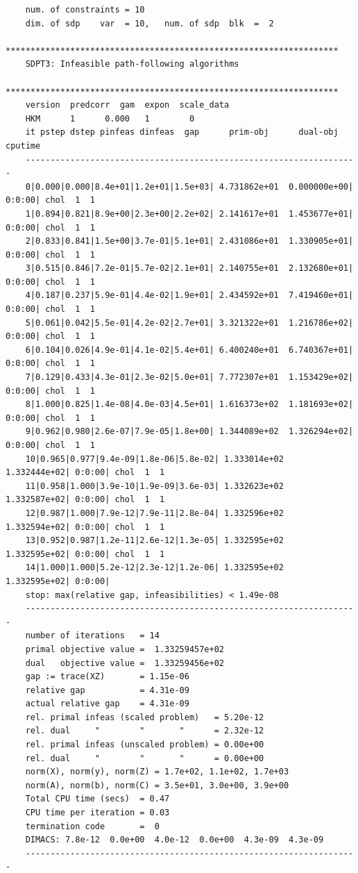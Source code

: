\documentclass[letter]{article}
\begin{document}
\begin{Verbatim}
	num. of constraints = 10
	dim. of sdp    var  = 10,   num. of sdp  blk  =  2
	*******************************************************************
	SDPT3: Infeasible path-following algorithms
	*******************************************************************
	version  predcorr  gam  expon  scale_data
	HKM      1      0.000   1        0    
	it pstep dstep pinfeas dinfeas  gap      prim-obj      dual-obj    cputime
	-------------------------------------------------------------------
	0|0.000|0.000|8.4e+01|1.2e+01|1.5e+03| 4.731862e+01  0.000000e+00| 0:0:00| chol  1  1 
	1|0.894|0.821|8.9e+00|2.3e+00|2.2e+02| 2.141617e+01  1.453677e+01| 0:0:00| chol  1  1 
	2|0.833|0.841|1.5e+00|3.7e-01|5.1e+01| 2.431086e+01  1.330905e+01| 0:0:00| chol  1  1 
	3|0.515|0.846|7.2e-01|5.7e-02|2.1e+01| 2.140755e+01  2.132680e+01| 0:0:00| chol  1  1 
	4|0.187|0.237|5.9e-01|4.4e-02|1.9e+01| 2.434592e+01  7.419460e+01| 0:0:00| chol  1  1 
	5|0.061|0.042|5.5e-01|4.2e-02|2.7e+01| 3.321322e+01  1.216786e+02| 0:0:00| chol  1  1 
	6|0.104|0.026|4.9e-01|4.1e-02|5.4e+01| 6.400240e+01  6.740367e+01| 0:0:00| chol  1  1 
	7|0.129|0.433|4.3e-01|2.3e-02|5.0e+01| 7.772307e+01  1.153429e+02| 0:0:00| chol  1  1 
	8|1.000|0.825|1.4e-08|4.0e-03|4.5e+01| 1.616373e+02  1.181693e+02| 0:0:00| chol  1  1 
	9|0.962|0.980|2.6e-07|7.9e-05|1.8e+00| 1.344089e+02  1.326294e+02| 0:0:00| chol  1  1 
	10|0.965|0.977|9.4e-09|1.8e-06|5.8e-02| 1.333014e+02  1.332444e+02| 0:0:00| chol  1  1 
	11|0.958|1.000|3.9e-10|1.9e-09|3.6e-03| 1.332623e+02  1.332587e+02| 0:0:00| chol  1  1 
	12|0.987|1.000|7.9e-12|7.9e-11|2.8e-04| 1.332596e+02  1.332594e+02| 0:0:00| chol  1  1 
	13|0.952|0.987|1.2e-11|2.6e-12|1.3e-05| 1.332595e+02  1.332595e+02| 0:0:00| chol  1  1 
	14|1.000|1.000|5.2e-12|2.3e-12|1.2e-06| 1.332595e+02  1.332595e+02| 0:0:00|
	stop: max(relative gap, infeasibilities) < 1.49e-08
	-------------------------------------------------------------------
	number of iterations   = 14
	primal objective value =  1.33259457e+02
	dual   objective value =  1.33259456e+02
	gap := trace(XZ)       = 1.15e-06
	relative gap           = 4.31e-09
	actual relative gap    = 4.31e-09
	rel. primal infeas (scaled problem)   = 5.20e-12
	rel. dual     "        "       "      = 2.32e-12
	rel. primal infeas (unscaled problem) = 0.00e+00
	rel. dual     "        "       "      = 0.00e+00
	norm(X), norm(y), norm(Z) = 1.7e+02, 1.1e+02, 1.7e+03
	norm(A), norm(b), norm(C) = 3.5e+01, 3.0e+00, 3.9e+00
	Total CPU time (secs)  = 0.47  
	CPU time per iteration = 0.03  
	termination code       =  0
	DIMACS: 7.8e-12  0.0e+00  4.0e-12  0.0e+00  4.3e-09  4.3e-09
	-------------------------------------------------------------------
	

\end{Verbatim}
\end{document}
